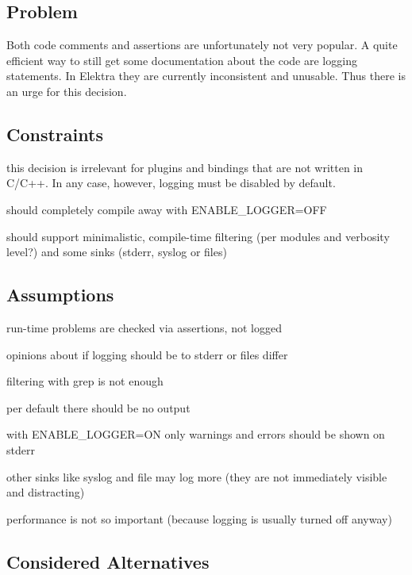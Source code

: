 \subsection*{Problem}

Both code comments and assertions are unfortunately not very popular. A quite efficient way to still get some documentation about the code are logging statements. In Elektra they are currently inconsistent and unusable. Thus there is an urge for this decision.

\subsection*{Constraints}


\begin{DoxyItemize}
\item this decision is irrelevant for plugins and bindings that are not written in C/\+C++. In any case, however, logging must be disabled by default.
\item should completely compile away with E\+N\+A\+B\+L\+E\+\_\+\+L\+O\+G\+G\+ER=O\+FF
\item should support minimalistic, compile-\/time filtering (per modules and verbosity level?) and some sinks (stderr, syslog or files)
\end{DoxyItemize}

\subsection*{Assumptions}


\begin{DoxyItemize}
\item run-\/time problems are checked via assertions, not logged
\item opinions about if logging should be to stderr or files differ
\item filtering with grep is not enough
\item per default there should be no output
\item with E\+N\+A\+B\+L\+E\+\_\+\+L\+O\+G\+G\+ER=ON only warnings and errors should be shown on stderr
\item other sinks like syslog and file may log more (they are not immediately visible and distracting)
\item performance is not so important (because logging is usually turned off anyway)
\end{DoxyItemize}

\subsection*{Considered Alternatives}


